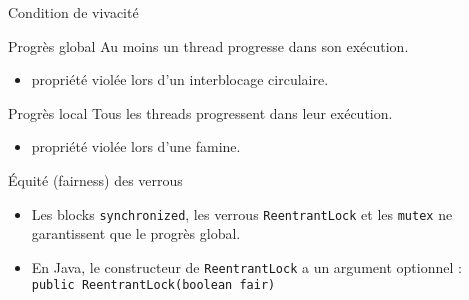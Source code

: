
\begingroup

\begin{frame}{Condition de vivacité}

  \begin{block}{Progrès global}
    \alert{Au moins un} thread progresse dans son exécution.
    \begin{itemize}
    \item propriété violée lors d'un interblocage circulaire.
    \end{itemize}
  \end{block}

  \begin{block}{Progrès local}
    \alert{Tous les threads} progressent dans leur exécution.
    \begin{itemize}
    \item propriété violée lors d'une famine.
    \end{itemize}
  \end{block}

\pause
  \begin{alertblock}{Équité (fairness) des verrous}
    \begin{itemize}
    \item Les blocks \lstinline{synchronized}, les verrous \lstinline{ReentrantLock} et les \lstinline{mutex} ne garantissent que le progrès global.
    \item En Java, le constructeur de \lstinline{ReentrantLock} a un argument optionnel :\\
      \lstinline{public ReentrantLock(boolean fair)}
    \end{itemize}
  \end{alertblock}
\end{frame}

\endgroup
\endinput
